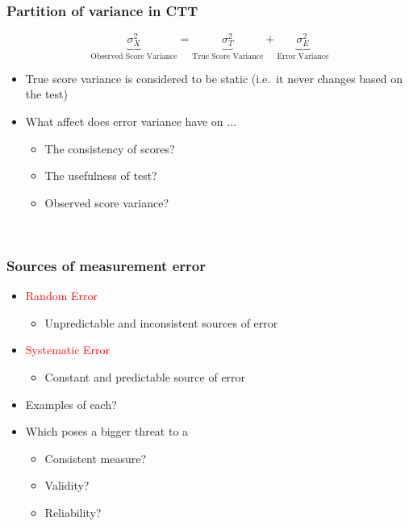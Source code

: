\documentclass[dvipsnames]{beamer}\usepackage[]{graphicx}\usepackage[]{color}
\begin{document}
\begin{frame}
\frametitle{Partition of variance in CTT}
$$\underbrace{\sigma^2_X}_{\text{Observed Score Variance}} = \underbrace{\sigma^2_T}_{\text{True Score Variance}} + \underbrace{\sigma^2_E}_{\text{Error Variance}}$$
\begin{itemize}
  \item True score variance is considered to be static (i.e.\ it never changes based on the test)
  \item What affect does error variance have on ...
    \begin{itemize}
      \item The consistency of scores?
      \item The usefulness of test?
      \item Observed score variance?
    \end{itemize}
\end{itemize}
\end{frame}

{
\begin{frame}
\centering
\Huge \textcolor{white}{What goes into error variance?}
\end{frame}
}

\begin{frame}
\frametitle{Sources of measurement error}
\begin{itemize}
\item<1->\textcolor{red}{Random Error}
  \begin{itemize}
  \item<2-> Unpredictable and inconsistent sources of error
  \end{itemize}
\item<3->\textcolor{red}{Systematic Error}
  \begin{itemize}
  \item<4->Constant and predictable source of error
  \end{itemize}
\item<5->Examples of each?
\item<6->Which poses a bigger threat to a
  \begin{itemize} 
    \item<7-> Consistent measure?
    \item<8-> Validity?
    \item<9-> Reliability?
  \end{itemize}
\end{itemize}
\end{frame}
\end{document}
